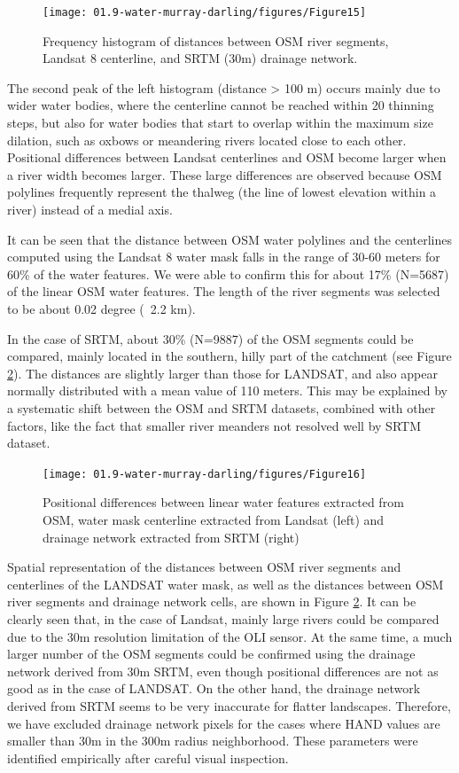 \begin{figure}
	\centering
	\texttt{[image: 01.9-water-murray-darling/figures/Figure15]}
	\caption{Frequency histogram of distances between OSM river segments, Landsat 8 centerline, and SRTM (30m) drainage network.}
	\label{fig:au-positional-differences}
\end{figure}
 
The second peak of the left histogram (distance > 100 m) occurs mainly due to wider water bodies, where the centerline cannot be reached within 20 thinning steps, but also for water bodies that start to overlap within the maximum size dilation, such as oxbows or meandering rivers located close to each other.  Positional differences between Landsat centerlines and OSM become larger when a river width becomes larger. These large differences are observed because OSM polylines frequently represent the thalweg (the line of lowest elevation within a river) instead of a medial axis.

It can be seen that the distance between OSM water polylines and the centerlines computed using the Landsat 8 water mask falls in the range of 30-60 meters for 60\% of the water features. We were able to confirm this for about 17\% (N=5687) of the linear OSM water features. The length of the river segments was selected to be about 0.02 degree (~2.2 km). 

In the case of SRTM, about 30\% (N=9887) of the OSM segments could be compared, mainly located in the southern, hilly part of the catchment (see Figure \ref{fig:au-positional-differences-map}). The distances are slightly larger than those for LANDSAT, and also appear normally distributed with a mean value of 110 meters. This may be explained by a systematic shift between the OSM and SRTM datasets, combined with other factors, like the fact that smaller river meanders not resolved well by SRTM dataset.

\begin{figure}
	\centering
	\texttt{[image: 01.9-water-murray-darling/figures/Figure16]}
	\caption{Positional differences between linear water features extracted from OSM, water mask centerline extracted from Landsat (left) and drainage network extracted from SRTM (right)}
	\label{fig:au-positional-differences-map}
\end{figure}

Spatial representation of the distances between OSM river segments and centerlines of the LANDSAT water mask, as well as the distances between OSM river segments and drainage network cells, are shown in Figure \ref{fig:au-positional-differences-map}. It can be clearly seen that, in the case of Landsat, mainly large rivers could be compared due to the 30m resolution limitation of the OLI sensor. At the same time, a much larger number of the OSM segments could be confirmed using the drainage network derived from 30m SRTM, even though positional differences are not as good as in the case of LANDSAT. On the other hand, the drainage network derived from SRTM seems to be very inaccurate for flatter landscapes. Therefore, we have excluded drainage network pixels for the cases where HAND values are smaller than 30m in the 300m radius neighborhood. These parameters were identified empirically after careful visual inspection.

